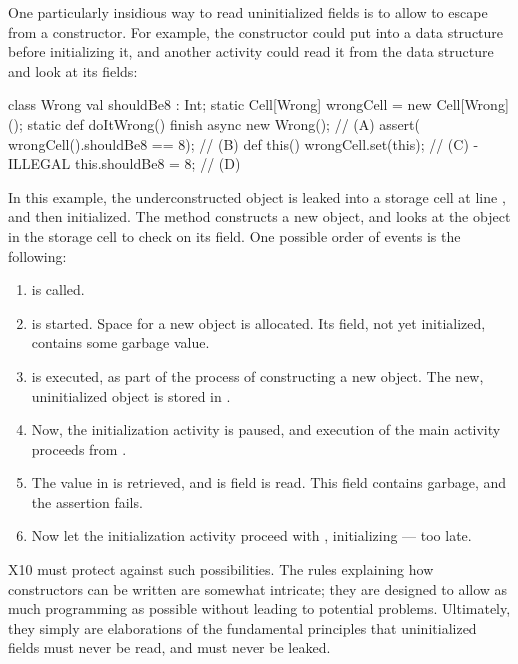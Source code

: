 One particularly insidious way to read uninitialized fields is to allow
 to escape from a constructor. For example, the constructor could
put  into a data structure before initializing it, and another
activity could read it from the data structure and look at its fields: 
\begin{xten}
class Wrong {
  val shouldBe8 : Int;
  static Cell[Wrong] wrongCell = new Cell[Wrong]();
  static def doItWrong() {
     finish { 
       async { new Wrong(); } // (A)
       assert( wrongCell().shouldBe8 == 8); // (B)
     }
  }
  def this() {
     wrongCell.set(this); // (C) - ILLEGAL 
     this.shouldBe8 = 8; // (D)
  }
}
\end{xten}
\noindent
In this example, the underconstructed  object is leaked into a
storage cell at line , and then initialized.  The 
method constructs a new  object, and looks at the 
object in the storage cell to check on its  field.  One
possible order of events is the following: 
\begin{enumerate}
\item {} is called.
\item {} is started.  Space for a new  object is allocated.
      Its  field, not yet initialized, contains some garbage
      value.
\item {} is executed, as part of the process of constructing a new
       object.  The new, uninitialized object is stored in
      . 
\item Now, the initialization activity is paused, and execution of the main activity 
      proceeds from .
\item The value in  is retrieved, and is  field
      is read.  This field contains garbage, and the assertion fails.
\item Now let the initialization activity proceed with ,
      initializing  --- too late.
\end{enumerate}

X10 must protect against such possibilities.  The rules explaining how
constructors can be written are somewhat intricate; they are designed to allow
as much programming as possible without leading to potential problems.
Ultimately, they simply are elaborations of the fundamental principles that
uninitialized fields must never be read, and  must never be leaked.  


